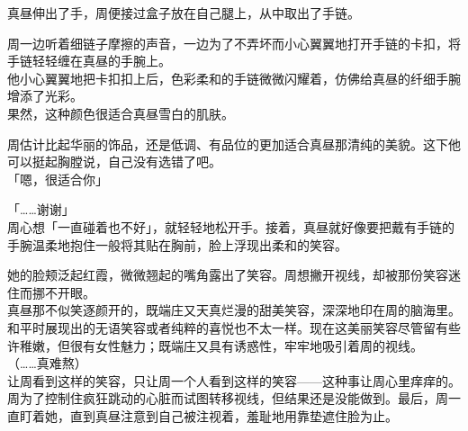 真昼伸出了手，周便接过盒子放在自己腿上，从中取出了手链。

周一边听着细链子摩擦的声音，一边为了不弄坏而小心翼翼地打开手链的卡扣，将手链轻轻缠在真昼的手腕上。\\

他小心翼翼地把卡扣扣上后，色彩柔和的手链微微闪耀着，仿佛给真昼的纤细手腕增添了光彩。\\

果然，这种颜色很适合真昼雪白的肌肤。

周估计比起华丽的饰品，还是低调、有品位的更加适合真昼那清纯的美貌。这下他可以挺起胸膛说，自己没有选错了吧。\\

「嗯，很适合你」

「……谢谢」\\

周心想「一直碰着也不好」，就轻轻地松开手。接着，真昼就好像要把戴有手链的手腕温柔地抱住一般将其贴在胸前，脸上浮现出柔和的笑容。

她的脸颊泛起红霞，微微翘起的嘴角露出了笑容。周想撇开视线，却被那份笑容迷住而挪不开眼。\\

真昼那不似笑逐颜开的，既端庄又天真烂漫的甜美笑容，深深地印在周的脑海里。\\

和平时展现出的无语笑容或者纯粹的喜悦也不太一样。现在这美丽笑容尽管留有些许稚嫩，但很有女性魅力；既端庄又具有诱惑性，牢牢地吸引着周的视线。\\

（……真难熬）\\

让周看到这样的笑容，只让周一个人看到这样的笑容——这种事让周心里痒痒的。\\

周为了控制住疯狂跳动的心脏而试图转移视线，但结果还是没能做到。最后，周一直盯着她，直到真昼注意到自己被注视着，羞耻地用靠垫遮住脸为止。
